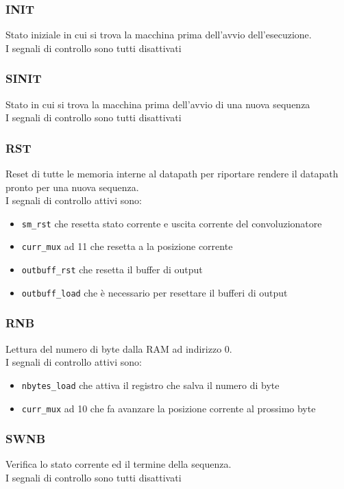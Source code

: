 \documentclass[12pt, a4paper]{article}
\begin{document}
\subsubsection{INIT}
Stato iniziale in cui si trova la macchina prima dell'avvio dell'esecuzione.\\
I segnali di controllo sono tutti disattivati

\subsubsection{SINIT}
Stato in cui si trova la macchina prima dell'avvio di una nuova sequenza\\
I segnali di controllo sono tutti disattivati

\subsubsection{RST}
Reset di tutte le memoria interne al datapath per riportare rendere il datapath pronto per
una nuova sequenza.\\
I segnali di controllo attivi sono:
\begin{itemize}
    \item \texttt{sm\_rst} che resetta stato corrente e uscita corrente del convoluzionatore
    \item \texttt{curr\_mux} ad 11 che resetta a la posizione corrente
    \item \texttt{outbuff\_rst} che resetta il buffer di output
    \item \texttt{outbuff\_load} che è necessario per resettare il bufferi di output
\end{itemize}

\subsubsection{RNB}
Lettura del numero di byte dalla RAM ad indirizzo 0.\\
I segnali di controllo attivi sono:
\begin{itemize}
    \item \texttt{nbytes\_load} che attiva il registro che salva il numero di byte
    \item \texttt{curr\_mux} ad 10 che fa avanzare la posizione corrente al prossimo byte
\end{itemize}

\subsubsection{SWNB}
Verifica lo stato corrente ed il termine della sequenza.\\
I segnali di controllo sono tutti disattivati
\end{document}
